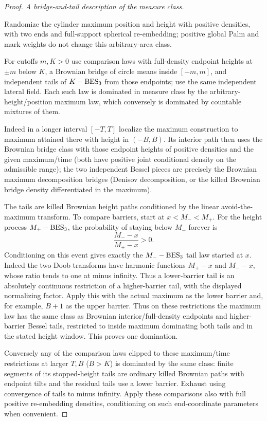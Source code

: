 \begin{proof}
\smallskip\noindent\emph{A bridge-and-tail description of the measure class.}\par

Randomize the cylinder maximum position and height with positive densities, with two ends and
full-support spherical re-embedding; positive global Palm and mark weights do not change this
arbitrary-area class.

For cutoffs \(m,K>0\) use comparison laws with full-density endpoint heights at \(\pm m\) below
\(K\), a Brownian bridge of circle means inside \([-m,m]\), and independent tails of \(K-{\rm
BES}_3\) from those endpoints; use the same independent lateral field. Each such law is dominated in
measure class by the arbitrary-height/position maximum law, which conversely is dominated by
countable mixtures of them.

Indeed in a longer interval \([-T,T]\) localize the maximum construction to maximum attained there
with height in \((-B,B)\). Its interior path then uses the Brownian bridge class with those endpoint
heights of positive densities and the given maximum/time (both have positive joint conditional
density on the admissible range); the two independent Bessel pieces are precisely the Brownian
maximum decomposition bridges (Denisov decomposition, or the killed Brownian bridge density
differentiated in the maximum).

The tails are killed Brownian height paths conditioned by the linear
avoid-the-maximum transform. To compare barriers, start at \(x<M_-<M_+\).
For the height process \(M_+-{\rm BES}_3\), the probability of staying
below \(M_-\) forever is
\[
                         \frac{M_--x}{M_+-x}>0.
\]
Conditioning on this event gives exactly the \(M_--{\rm BES}_3\) tail
law started at \(x\). Indeed the two Doob transforms have harmonic
functions \(M_+-x\) and \(M_--x\), whose ratio tends to one at minus
infinity. Thus a lower-barrier tail is an absolutely continuous
restriction of a higher-barrier tail, with the displayed normalizing
factor. Apply this with the actual maximum as the lower barrier and,
for example, \(B+1\) as the upper barrier. Thus on these restrictions the maximum law has the same
class as Brownian interior/full-density endpoints and higher-barrier Bessel tails, restricted to
inside maximum dominating both tails and in the stated height window. This proves one domination.

Conversely any of the comparison laws clipped to these maximum/time restrictions at larger \(T,B\)
(\(B>K\)) is dominated by the same class: finite segments of its stopped-height tails are ordinary
killed Brownian paths with endpoint tilts and the residual tails use a lower barrier. Exhaust using
convergence of tails to minus infinity. Apply these comparisons also with full positive re-embedding
densities, conditioning on such end-coordinate parameters when convenient.


\end{proof}
